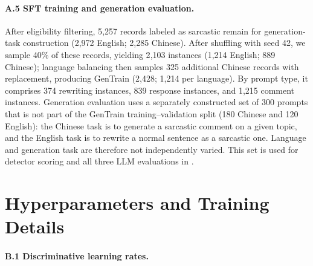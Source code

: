 \paragraph{A.5 SFT training and generation evaluation.} After eligibility filtering, 5{,}257 records labeled as sarcastic remain for generation-task construction (2{,}972 English; 2{,}285 Chinese). After shuffling with seed 42, we sample 40\% of these records, yielding 2{,}103 instances (1{,}214 English; 889 Chinese); language balancing then samples 325 additional Chinese records with replacement, producing GenTrain (2{,}428; 1{,}214 per language). By prompt type, it comprises 374 rewriting instances, 839 response instances, and 1{,}215 comment instances. Generation evaluation uses a separately constructed set of 300 prompts that is not part of the GenTrain training--validation split (180 Chinese and 120 English): the Chinese task is to generate a sarcastic comment on a given topic, and the English task is to rewrite a normal sentence as a sarcastic one. Language and generation task are therefore not independently varied. This set is used for detector scoring and all three LLM evaluations in .

\section{Hyperparameters and Training Details}
\label{app:hyper}

\paragraph{B.1 Discriminative learning rates.}

